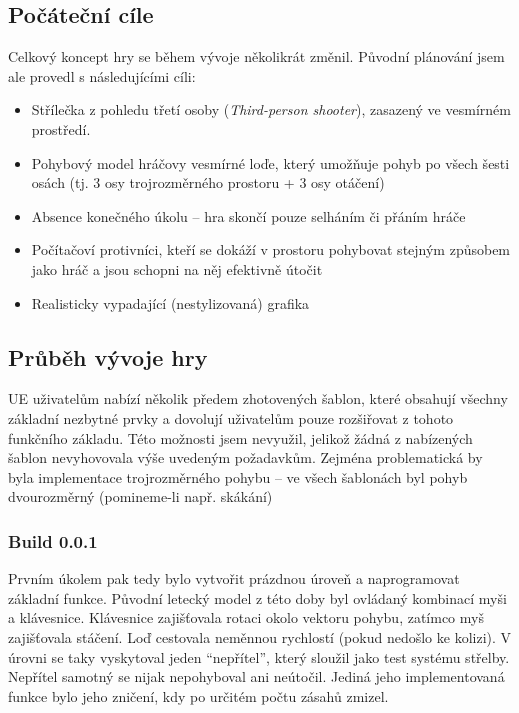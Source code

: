 \documentclass[12pt,a4paper,hidelinks]{article}
\begin{document}
\subsection{Počáteční cíle}
Celkový koncept hry se během vývoje několikrát změnil. Původní plánování jsem ale provedl s následujícími cíli:
\begin{itemize}
	\item Střílečka z pohledu třetí osoby (\textit{Third-person shooter}), zasazený ve vesmírném prostředí.\\
	\item Pohybový model hráčovy vesmírné loďe, který umožňuje pohyb po všech šesti osách (tj. 3 osy trojrozměrného prostoru + 3 osy otáčení)\\
	\item Absence konečného úkolu – hra skončí pouze selháním či přáním hráče\\
	\item Počítačoví protivníci, kteří se dokáží v prostoru pohybovat stejným způsobem jako hráč a jsou schopni na něj efektivně útočit\\
	\item Realisticky vypadající (nestylizovaná) grafika\\
\end{itemize}

\subsection{Průběh vývoje hry}
UE uživatelům nabízí několik předem zhotovených šablon, které obsahují všechny základní nezbytné prvky a dovolují uživatelům pouze rozšiřovat z tohoto funkčního základu. Této možnosti jsem nevyužil, jelikož žádná z nabízených šablon nevyhovovala výše uvedeným požadavkům. Zejména problematická by byla implementace trojrozměrného pohybu – ve všech šablonách byl pohyb dvourozměrný (pomineme-li např. skákání)\\
\subsubsection{Build 0.0.1}
Prvním úkolem pak tedy bylo vytvořit prázdnou úroveň a naprogramovat základní funkce. Původní letecký model z této doby byl ovládaný kombinací myši a klávesnice. Klávesnice zajišťovala rotaci okolo vektoru pohybu, zatímco myš zajišťovala stáčení. Loď cestovala neměnnou rychlostí (pokud nedošlo ke kolizi). V úrovni se taky vyskytoval jeden \enquote{nepřítel}, který sloužil jako test systému střelby. Nepřítel samotný se nijak nepohyboval ani neútočil. Jediná jeho implementovaná funkce bylo jeho zničení, kdy po určitém počtu zásahů zmizel.\\
\end{document}
